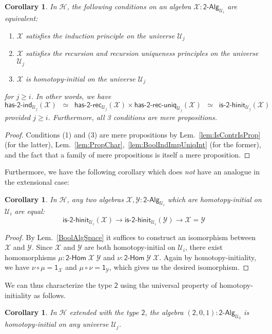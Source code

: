 \documentclass[11pt]{article}
\newcommand{\X}{\mathcal{X}}
\newcommand{\Y}{\mathcal{Y}}
\newcommand{\comp}{\circ}
\newcommand{\Bool}{\mathsf{2}}
\newcommand{\one}{\mathsf{1}}
\newcommand{\UU}{\mathcal{U}}
\newcommand{\BoolAlg}{\mathsf{2}\text{-}\mathsf{Alg}}
\newcommand{\BoolHom}{\mathsf{2}\text{-}\mathsf{Hom}}
\newcommand{\HasBoolRec}{\mathsf{has}\text{-}\mathsf{2}\text{-}\mathsf{rec}}
\newcommand{\HasBoolInd}{\mathsf{has}\text{-}\mathsf{2}\text{-}\mathsf{ind}}
\newcommand{\HasBoolRecUniq}{\mathsf{has}\text{-}\mathsf{2}\text{-}\mathsf{rec}\text{-}\mathsf{uniq}}
\newcommand{\IsBoolHInit}{\mathsf{is}\text{-}\mathsf{2}\text{-}\mathsf{hinit}}
\newcommand{\Hint}{\mathcal{H}}
\newtheorem{corollary}[theorem]{Corollary}
\theoremstyle{definition}
\begin{document}
\begin{corollary}\label{lem:BoolMainInt}
In $\Hint$, the following conditions on an algebra $\X : \BoolAlg_{\UU_i}$ are equivalent:
\begin{enumerate}
\item $\X$ satisfies the induction principle on the universe $\UU_j$
\item $\X$ satisfies the recursion and recursion uniqueness principles on the universe $\UU_j$
\item $\X$ is homotopy-initial on the universe $\UU_j$  
\end{enumerate}
for $j \geq i$. In other words, we have \[ \HasBoolInd_{\UU_j}(\X)  \;\; \simeq \;\; \HasBoolRec_{\UU_j}(\X) \times \HasBoolRecUniq_{\UU_j}(\X) \;\; \simeq \;\; \IsBoolHInit_{\UU_j}(\X) \]
provided $j \geq i$. Furthermore, all 3 conditions are mere propositions.
\end{corollary}
\begin{proof}
Conditions (1) and (3) are mere propositions by Lem.~\ref{lem:IsContrIsProp} (for the latter), Lem.~\ref{lem:PropChar},~\ref{lem:BoolIndImpUniqInt} (for the former), and the fact that a family of mere propositions is itself a mere proposition.
\end{proof}

Furthermore, we have the following corollary which does \emph{not} have an analogue in the extensional case:
\begin{corollary}\label{BoolHInitIso}
In $\Hint$, any two algebras $\X,\Y : \BoolAlg_{\UU_i}$ which are homotopy-initial on $\UU_i$ are equal:
\[ \IsBoolHInit_{\UU_i}(\X) \to \IsBoolHInit_{\UU_i}(\Y) \to \X = \Y\] 
\end{corollary}
\begin{proof}
By Lem.~\ref{BoolAlgSpace} it suffices to construct an isomorphism between $\X$ and $\Y$. Since $\X$ and $\Y$ are both homotopy-initial on $\UU_i$, there exist homomorphisms $\mu : \BoolHom \; \X \; \Y$ and $\nu : \BoolHom \; \Y \; \X$. Again by homotopy-initiality, we have $\nu \comp \mu = \one_\X$ and $\mu \comp \nu = \one_\Y$, which gives us the desired isomorphism.
\end{proof}

We can thus characterize the type $\Bool$ using the universal property of homotopy-initiality as follows.
\begin{corollary}\label{lem:BoolInitInt}
In $\Hint$ extended with the type $\Bool$, the algebra $(\Bool,0,1) : \BoolAlg_{\UU_0}$ is homotopy-initial on any universe $\UU_j$.
\end{corollary}
\end{document}
